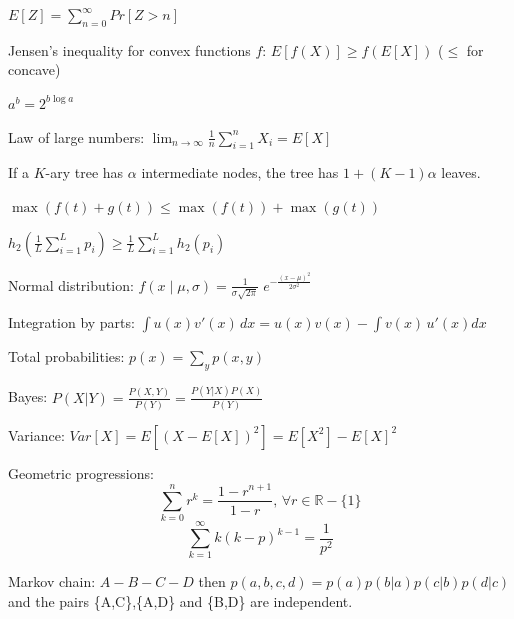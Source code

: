 \documentclass[10pt,a4paper,landscape]{article}
\begin{document}
\begin{multicols*}{4}
$E[Z] = \sum_{n=0}^{\infty} Pr[Z > n]$

Jensen's inequality for convex functions $f$: $ E[f(X)] \geq f(E[X])$ ($\leq$ for concave)

$a^b = 2^{ b \log a}$

Law of large numbers: $\lim_{n \rightarrow \infty} \frac{1}{n} \sum_{i=1}^n X_i = E[X]$

If a $K$-ary tree has $\alpha$ intermediate nodes, the tree has $1+(K-1)\alpha$ leaves.


$\max(f(t) + g(t)) \leq \max(f(t)) + \max(g(t))$


$h_2 \left(\frac{1}{L}\sum_{i=1}^L p_i \right) \geq \frac{1}{L} \sum_{i=1}^L h_2(p_i)$

Normal distribution: $f(x \; | \; \mu, \sigma) = \frac{1}{\sigma\sqrt{2\pi} } \; e^{ -\frac{(x-\mu)^2}{2\sigma^2} }$

Integration by parts: $\int u(x) v'(x) \, dx = u(x) v(x) - \int v(x) \, u'(x)  dx$ 

Total probabilities: $p(x) = \sum_y p(x,y)$

Bayes: $P(X|Y) = \frac{P(X,Y)}{P(Y)} = \frac{P(Y|X)P(X)}{P(Y)}$

Variance: $Var[X] = E[(X-E[X])^2] = E[X^2] - E[X]^2$

Geometric progressions:
$$\sum_{k=0}^n r^k = \frac{1-r^{n+1}}{1-r},\, \forall r \in \mathbb{R}-\{1\}$$
$$\sum_{k=1}^\infty k(k-p)^{k-1} = \frac{1}{p^2}$$

Markov chain: $A-B-C-D$ then $p(a,b,c,d) = p(a)p(b|a)p(c|b)p(d|c)$ and the pairs \{A,C\},\{A,D\} and \{B,D\} are independent.

\end{multicols*}
\end{document}
